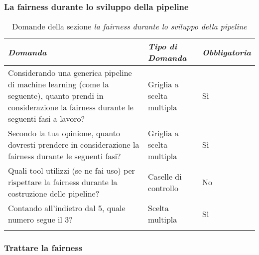 \subsubsection{La fairness durante lo sviluppo della pipeline}

\begin{longtable}{| p{} | p{} | p{} |} 
\hline\textbf{\textit{Domanda}} & \textbf{\textit{Tipo di Domanda}} & \textbf{\textit{Obbligatoria}}\\
\hline
\endhead 

\hline 
Considerando una generica pipeline di machine learning (come la seguente), quanto prendi in considerazione la fairness durante le seguenti fasi a lavoro?

& Griglia a scelta multipla

& Sì 

\\ \hline
\rowcolor{Gray!30}
Secondo la tua opinione, quanto dovresti prendere in considerazione la fairness durante le seguenti fasi?

& Griglia a scelta multipla

& Sì 

\\ \hline

Quali tool utilizzi (se ne fai uso) per rispettare la fairness durante la costruzione delle pipeline?

&  Caselle di controllo

& No

\\ \hline
\rowcolor{Gray!30}
Contando all'indietro dal 5, quale numero segue il 3?

&  Scelta multipla

& Sì

\\ \hline 
\caption{Domande della sezione \emph{la fairness durante lo sviluppo della pipeline}} %
\label{tab:myfirstlongtable}
\end{longtable}

\subsubsection{Trattare la fairness}

